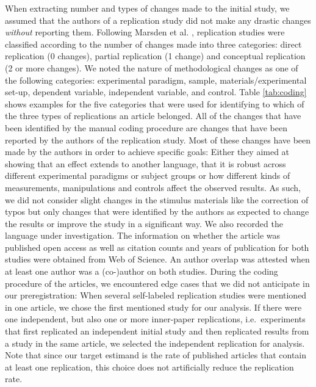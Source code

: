 \documentclass[cm,linguex]{glossa}
\begin{document}
When extracting number and types of changes made to the initial study, we assumed that the authors of a replication study did not make any drastic changes \emph{without} reporting them.
Following Marsden et al. \citeyearpar{marsden_replication_2018}, replication studies were classified according to the number of changes made into three categories: direct replication (0 changes), partial replication (1 change) and conceptual replication (2 or more changes).
We noted the nature of methodological changes as one of the following categories:
experimental paradigm, sample, materials/experimental set-up, dependent variable, independent variable, and control.
Table \ref{tab:coding} shows examples for the five categories that were used for identifying to which of the three types of replications an article belonged.
All of the changes that have been identified by the manual coding procedure are changes that have been reported by the authors of the replication study. Most of these changes have been made by the authors in order to achieve specific goals: Either they aimed at showing that an effect extends to another language, that it is robust across different experimental paradigms or subject groups or how different kinds of measurements, manipulations and controls affect the observed results. As such, we did not consider slight changes in the stimulus materials like the correction of typos but only changes that were identified by the authors as expected to change the results or improve the study in a significant way.
We also recorded the language under investigation.
The information on whether the article was published open access as well as citation counts and years of publication for both studies were obtained from Web of Science.
An author overlap was attested when at least one author was a (co-)author on both studies.
During the coding procedure of the articles, we encountered edge cases that we did not anticipate in our preregistration: When several self-labeled replication studies were mentioned in one article, we chose the first mentioned study for our analysis. If there were one independent, but also one or more inner-paper replications, i.e.~experiments that first replicated an independent initial study and then replicated results from a study in the same article, we selected the independent replication for analysis. Note that since our target estimand is the rate of published articles that contain at least one replication, this choice does not artificially reduce the replication rate.

\providecommand{\docline}[3]{\noalign{\global\setlength{\arrayrulewidth}{#1}}\arrayrulecolor[HTML]{#2}\cline{#3}}
\end{document}
